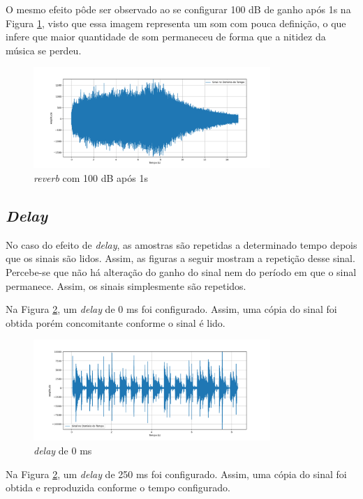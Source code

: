 O mesmo efeito pôde ser observado ao se configurar 100 dB de ganho após 1s na Figura \ref{fig73}, visto que essa imagem representa um som com pouca definição, o que infere que maior quantidade de som permaneceu de forma que a nitidez da música se perdeu.

\begin{figure}[h]
	\centering
    \includegraphics[width=0.8\textwidth]{figuras/fig73.png}
	\caption{\textit{reverb} com 100 dB após 1s}
	\label{fig73}
\end{figure}

\subsection{\textit{Delay}}

No caso do efeito de \textit{delay}, as amostras são repetidas a determinado tempo depois que os sinais são lidos. Assim, as figuras a seguir mostram a repetição desse sinal. Percebe-se que não há alteração do ganho do sinal nem do período em que o sinal permanece. Assim, os sinais simplesmente são repetidos.

Na Figura \ref{fig74}, um \textit{delay} de 0 ms foi configurado. Assim, uma cópia do sinal foi obtida porém concomitante conforme o sinal é lido. 

\begin{figure}[h]
	\centering
    \includegraphics[width=0.8\textwidth]{figuras/fig74.png}
	\caption{\textit{delay} de 0 ms}
	\label{fig74}
\end{figure}


Na Figura \ref{fig74}, um \textit{delay} de 250 ms foi configurado. Assim, uma cópia do sinal foi obtida e reproduzida conforme o tempo configurado.

